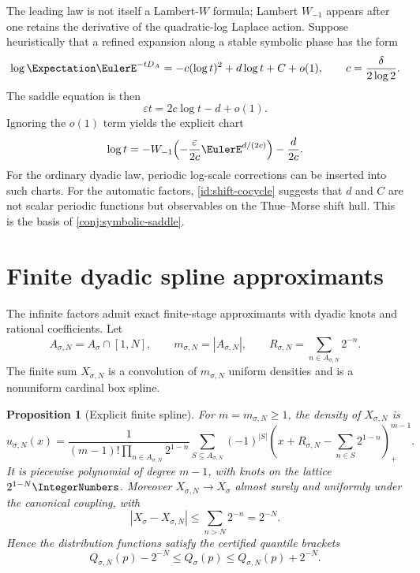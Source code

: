 \documentclass[11pt,oneside]{article}
\numberwithin{equation}{section}
\newtheorem{proposition}[theorem]{Proposition}
\theoremstyle{definition}
\theoremstyle{remark}
\newcommand{\eps}{\varepsilon}
\begin{document}
The leading law is not itself a Lambert-$W$ formula; Lambert $W_{-1}$ appears after one
retains the derivative of the quadratic-log Laplace action.  Suppose heuristically that a
refined expansion along a stable symbolic phase has the form
\begin{equation}
 \log\Expectation\EulerE^{-tD_A}
 =-c(\log t)^2+d\log t+C+o(1),
 \qquad c=\frac\delta{2\log2}.
 \label{eq:refined-Laplace-heuristic}
\end{equation}
The saddle equation is then
\begin{equation}
 \eps t=2c\log t-d+o(1).
 \label{eq:saddle-equation}
\end{equation}
Ignoring the $o(1)$ term yields the explicit chart
\begin{equation}
 \log t
 =-W_{-1}\!\left(-\frac{\eps}{2c}\EulerE^{d/(2c)}\right)-\frac d{2c}.
 \label{eq:Lambert-chart}
\end{equation}
For the ordinary dyadic law, periodic log-scale corrections can be inserted into such
charts.  For the automatic factors, \cref{id:shift-cocycle} suggests that $d$ and $C$ are
not scalar periodic functions but observables on the Thue--Morse shift hull.  This is the
basis of \cref{conj:symbolic-saddle}.

\section{Finite dyadic spline approximants}
\label{sec:splines}

The infinite factors admit exact finite-stage approximants with dyadic knots and rational
coefficients.  Let
\begin{equation}
 A_{\sigma,N}=A_\sigma\cap[1,N],
 \qquad m_{\sigma,N}=|A_{\sigma,N}|,
 \qquad R_{\sigma,N}=\sum_{n\in A_{\sigma,N}}2^{-n}.
 \label{eq:finite-selector}
\end{equation}
The finite sum $X_{\sigma,N}$ is a convolution of $m_{\sigma,N}$ uniform densities and is
a nonuniform cardinal box spline.

\begin{proposition}[Explicit finite spline]
\label{prop:finite-spline}
For $m=m_{\sigma,N}\ge1$, the density of $X_{\sigma,N}$ is
\begin{equation}
 u_{\sigma,N}(x)
 =\frac{1}{(m-1)!\prod_{n\in A_{\sigma,N}}2^{1-n}}
 \sum_{S\subseteq A_{\sigma,N}}(-1)^{|S|}
 \left(x+R_{\sigma,N}-\sum_{n\in S}2^{1-n}\right)_+^{m-1}.
 \label{eq:finite-spline}
\end{equation}
It is piecewise polynomial of degree $m-1$, with knots on the lattice $2^{1-N}\IntegerNumbers$.
Moreover $X_{\sigma,N}\to X_\sigma$ almost surely and uniformly under the canonical
coupling, with
\begin{equation}
 |X_\sigma-X_{\sigma,N}|
 \le\sum_{n>N}2^{-n}=2^{-N}.
 \label{eq:coupling-error}
\end{equation}
Hence the distribution functions satisfy the certified quantile brackets
\begin{equation}
 Q_{\sigma,N}(p)-2^{-N}\le Q_\sigma(p)
 \le Q_{\sigma,N}(p)+2^{-N}.
 \label{eq:quantile-bracket}
\end{equation}
\end{proposition}
\end{document}
